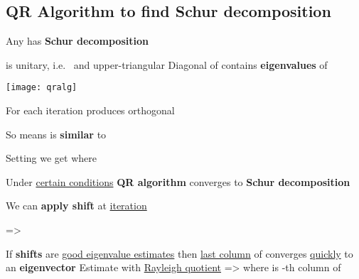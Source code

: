 \subsection*{\texorpdfstring{QR Algorithm to find Schur decomposition
            }{QR Algorithm to find Schur decomposition }}


Any  has 
\textbf{Schur decomposition} 
\begin{itemize}

      \vItem
             is unitary, i.e.~ and
            upper-triangular 
      \vItem
            Diagonal of  contains \textbf{eigenvalues} of 
\end{itemize}

\hSep %

\texttt{[image: qralg]}

\begin{itemize}

      \vItem For  each iteration
             produces orthogonal

      \vItem So 
            means  is \textbf{similar} to 

      \vItem Setting  we get
             where
      
      \vItem Under \underline{certain conditions} \textbf{QR algorithm} converges to
            \textbf{Schur decomposition}
\end{itemize}

\hSep %

We can \textbf{apply shift}  at \underline{iteration} 

=> 
\begin{itemize}

      \vItem
            If \textbf{shifts} are \underline{good eigenvalue estimates} then \underline{last column} of
             converges \underline{quickly} to an \textbf{eigenvector}
      \vItem
            Estimate  with \underline{Rayleigh quotient} =>
            where  is -th column of

\end{itemize}